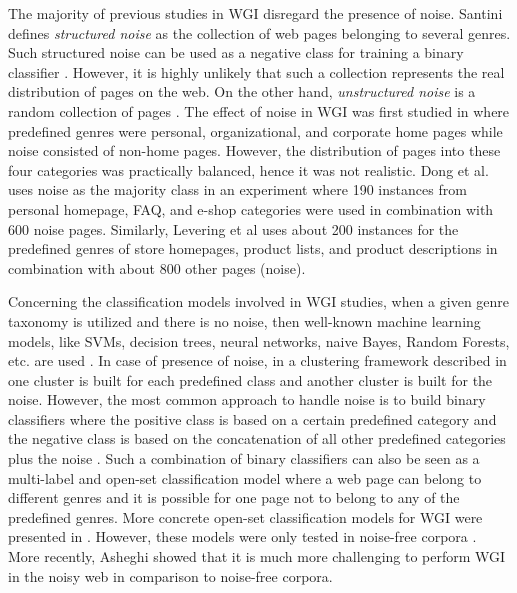 The majority of previous studies in WGI disregard the presence of noise. Santini \parencite{santini2011cross} defines \textit{structured noise} as the collection of web pages belonging to several genres. Such structured noise can be used as a negative class for training a binary classifier \parencite{Vidulin2007}. However, it is highly unlikely that such a collection represents the real distribution of pages on the web. On the other hand, \textit{unstructured noise} is a random collection of pages \parencite{santini2011cross}. The effect of noise in WGI was first studied in \parencite{shepherd2004cybergenre,kennedy2005automatic} where predefined genres were personal, organizational, and corporate home pages while noise consisted of non-home pages. However, the distribution of pages into these four categories was practically balanced, hence it was not realistic. Dong et al.\parencite{dong2006binary} uses noise as the majority class in an experiment where 190 instances from personal homepage, FAQ, and e-shop categories were used in combination with 600 noise pages. Similarly, Levering et al \parencite{levering2008using} uses about 200 instances for the predefined genres of store homepages, product lists, and product descriptions in combination with about 800 other pages (noise).

Concerning the classification models involved in WGI studies, when a given genre taxonomy is utilized and there is no noise, then well-known machine learning models, like SVMs, decision trees, neural networks, naive Bayes, Random Forests, etc. are used \parencite{Lim2005,santini2007automatic,kanaris2009learning,jebari2015combination,sharoff2010web}. In case of presence of noise, in a clustering framework described in \parencite{kennedy2005automatic} one cluster is built for each predefined class and another cluster is built for the noise. However, the most common approach to handle noise is to build binary classifiers where the positive class is based on a certain predefined category and the negative class is based on the concatenation of all other predefined categories plus the noise \parencite{kennedy2005automatic,dong2006binary,levering2008using}. Such a combination of binary classifiers can also be seen as a multi-label and open-set classification model where a web page can belong to different genres and it is possible for one page not to belong to any of the predefined genres. More concrete open-set classification models for WGI were presented in \parencite{stubbe2007genre,pritsos2013open}. However, these models were only tested in noise-free corpora \parencite{pritsos2015clef}. More recently, Asheghi \parencite{Asheghi2015} showed that it is much more challenging to perform WGI in the noisy web in comparison to noise-free corpora.

